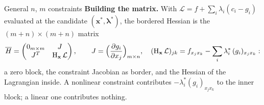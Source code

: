 \begin{rulebox}{General $n$, $m$ constraints}
\textbf{Building the matrix.} With $\mathcal{L}=f+\sum_i\lambda_i(c_i-g_i)$
evaluated at the candidate $(\mathbf{x}^*,\boldsymbol{\lambda}^*)$, the
bordered Hessian is the $(m+n)\times(m+n)$ matrix
\[
  \overline{H}=\begin{pmatrix} 0_{m\times m} & J\\ J^{T} & \operatorname{H}_{\mathbf{x}}\mathcal{L}\end{pmatrix},
  \qquad J=\Bigl(\frac{\partial g_i}{\partial x_j}\Bigr)_{m\times n},\quad
  (\operatorname{H}_{\mathbf{x}}\mathcal{L})_{jk}=f_{x_jx_k}-\sum_i\lambda_i^*\,(g_i)_{x_jx_k}:
\]
a zero block, the constraint Jacobian as border, and the Hessian of the
Lagrangian inside. A nonlinear constraint contributes
$-\lambda_i^*(g_i)_{x_jx_k}$ to the inner block; a linear one contributes
nothing.


\end{rulebox}
